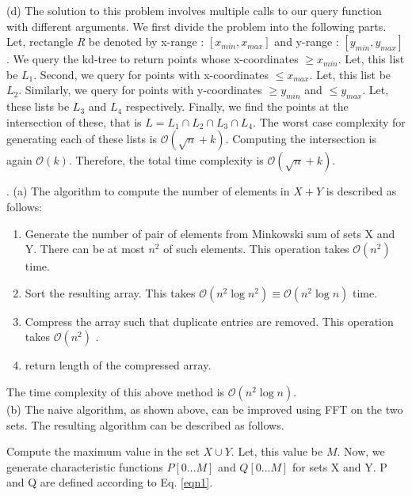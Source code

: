 \documentclass[assign]{article}
\begin{document}

\noindent (d) The solution to this problem involves multiple calls to our query function with different arguments. We first divide the problem into the following parts. Let, rectangle {\emph R} be denoted by x-range : $[x_{min}, x_{max}]$ and y-range : $[y_{min}, y_{max}]$.  We query the kd-tree to return points whose x-coordinates $\ge x_{min}$. Let, this list be $L_{1}$. Second, we query for points with x-coordinates $\le  x_{max}$. Let, this list be $L_{2}$. Similarly, we query for points with y-coordinates $\ge y_{min}$ and $\le y_{max}$. Let, these lists be $L_3$ and $L_4$ respectively. Finally, we find the points at the intersection of these, that is $L = L_1 \cap L_2 \cap L_3 \cap L_4$. The worst case complexity for generating each of these lists is $\mathcal{O}(\sqrt{n} + k)$. Computing the intersection is again $\mathcal{O}(k)$. Therefore, the total time complexity is $\mathcal{O}(\sqrt{n} + k)$.
\vspace{10pt}

. (a) The algorithm to compute the number of elements in $X + Y$ is described as follows: 

\begin{enumerate}
  \item Generate the number of pair of elements from Minkowski sum of sets X and Y. There can be at most $n^2$ of such elements. This operation takes $\mathcal{O}(n^2)$ time.
  \item Sort the resulting array. This takes $\mathcal{O}(n^2 \log n^2) \equiv \mathcal{O}(n^2 \log n)$ time. 
   \item Compress the array such that duplicate entries are removed. This operation takes $\mathcal{O}(n^2)$ .
   \item return length of the compressed array.
\end{enumerate}

\noindent The time complexity of this above method is $\mathcal{O}(n^2 \log n)$. \\

\noindent (b) The naive algorithm, as shown above, can be improved using FFT on the two sets. The resulting algorithm can be described as follows.

\noindent Compute the maximum value in the set $X \cup Y$. Let, this value be $M$. Now, we generate characteristic functions $P[0 \dots M]$ and $Q[0 \dots M]$  for sets X and Y. P and Q are defined according to Eq. \ref{eqn1}.
\end{document}
